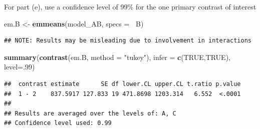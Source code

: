 \documentclass[12pt,]{article}
\newenvironment{Shaded}{\begin{snugshade}}{\end{snugshade}}
\newcommand{\KeywordTok}[1]{\textcolor[rgb]{0.13,0.29,0.53}{\textbf{#1}}}
\newcommand{\DataTypeTok}[1]{\textcolor[rgb]{0.13,0.29,0.53}{#1}}
\newcommand{\DecValTok}[1]{\textcolor[rgb]{0.00,0.00,0.81}{#1}}
\newcommand{\StringTok}[1]{\textcolor[rgb]{0.31,0.60,0.02}{#1}}
\newcommand{\OtherTok}[1]{\textcolor[rgb]{0.56,0.35,0.01}{#1}}
\newcommand{\OperatorTok}[1]{\textcolor[rgb]{0.81,0.36,0.00}{\textbf{#1}}}
\newcommand{\NormalTok}[1]{#1}
\begin{document}
For part (e), use a confidence level of 99\% for the one primary
contrast of interest

\begin{Shaded}
\begin{Highlighting}[]
\NormalTok{em.B <-}\StringTok{ }\KeywordTok{emmeans}\NormalTok{(model_AB, }\DataTypeTok{specs =} \OperatorTok{~}\NormalTok{B)}
\end{Highlighting}
\end{Shaded}

\begin{verbatim}
## NOTE: Results may be misleading due to involvement in interactions
\end{verbatim}

\begin{Shaded}
\begin{Highlighting}[]
\KeywordTok{summary}\NormalTok{(}\KeywordTok{contrast}\NormalTok{(em.B, }\DataTypeTok{method =} \StringTok{"tukey"}\NormalTok{), }\DataTypeTok{infer =} \KeywordTok{c}\NormalTok{(}\OtherTok{TRUE}\NormalTok{,}\OtherTok{TRUE}\NormalTok{), }\DataTypeTok{level=}\NormalTok{.}\DecValTok{99}\NormalTok{)}
\end{Highlighting}
\end{Shaded}

\begin{verbatim}
##  contrast estimate      SE df lower.CL upper.CL t.ratio p.value
##  1 - 2    837.5917 127.833 19 471.8698 1203.314   6.552  <.0001
## 
## Results are averaged over the levels of: A, C 
## Confidence level used: 0.99
\end{verbatim}
\end{document}
